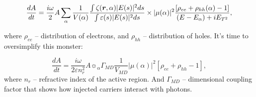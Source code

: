 \begin{equation}
	\frac{d A}{d t} = \frac{i \omega}{2} A \sum_\alpha \frac{1}{V(\alpha)} \frac{\int \zeta(\mbox{\boldmath $r$}, \alpha) |E (s)|^2 ds}{\int \varepsilon(s) |E(s)|^2 d s}
	\times |\mu(\alpha)|^2  \frac{[\rho_{ee} + \rho_{hh}(\alpha) - 1]}{(E-E_\alpha) + i E_{T^2}},
\end{equation}

where $\rho_{ee}$ -- distribution of electrons, and $\rho_{hh}$ -- distribution of holes. It's time to oversimplify  this monster:

\begin{equation}
	\frac{d A}{d t} = \frac{i \omega}{2 \varepsilon n_r^2} A \sun_\alpha \Gamma_{MD} \frac{1}{V_{MD}} |\mu(\alpha)|^2[\rho_{ee} + \rho_{hh} - 1],
\end{equation}
where $n_r$ -- refractive index of the active region.
And $\Gamma_{MD}$ -- dimensional coupling factor that shows how injected carriers interact with photons.